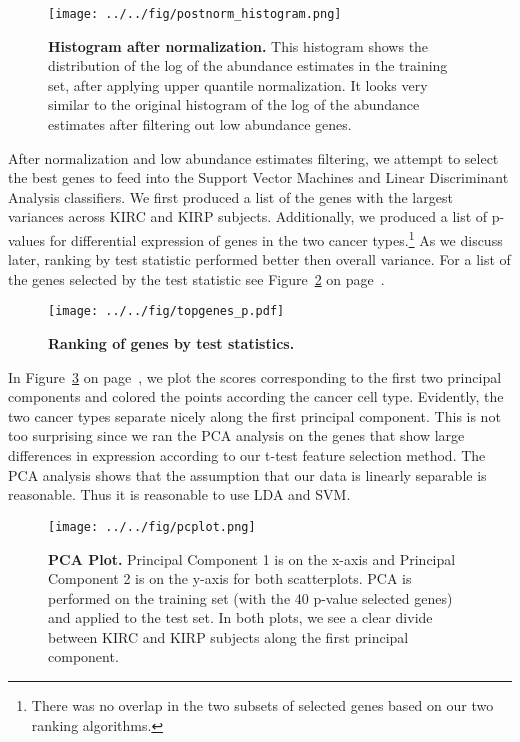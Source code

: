 \begin{figure}[H]
  \centering
    \texttt{[image: ../../fig/postnorm\_histogram.png]}
\caption{\textbf{Histogram after normalization.} This histogram shows the distribution
  of the log of the abundance estimates in the training set, after applying upper quantile
  normalization. It looks very similar to the original histogram of the
  log of the abundance estimates after filtering out low abundance genes.}
   \label{fig:histogrampost}
\end{figure}

After normalization and low abundance estimates filtering, we attempt to select the
best genes to feed into the Support Vector Machines and Linear Discriminant
Analysis classifiers.  We first produced a list of the genes with the largest
variances across KIRC and KIRP subjects.
Additionally, we produced a list of p-values for
differential expression of genes in the two cancer types.\footnote{There was
no overlap in the two subsets of selected genes based on our two ranking
algorithms.}
As we discuss later, ranking by test statistic performed better then
overall variance.  For a list of the genes selected by the test statistic
see Figure~\ref{fig:ttest} on page~\pageref{fig:ttest}.

\begin{figure}[H]
  \centering
    \texttt{[image: ../../fig/topgenes\_p.pdf]}
\caption{\textbf{Ranking of genes by test statistics.}}
   \label{fig:ttest}
\end{figure}



In Figure~\ref{fig:pca} on page~\pageref{fig:pca}, we plot the scores
corresponding to the first two principal components and colored the points
according the cancer cell type.  Evidently, the two cancer types separate
nicely along the first principal component. This is not too surprising since we
ran the PCA analysis on the genes that show large differences in expression
according to our t-test feature selection method.   The PCA analysis shows that
the assumption that our data is linearly separable is reasonable. Thus it is
reasonable to use LDA and SVM. 

\begin{figure}[H]
  \centering
    \texttt{[image: ../../fig/pcplot.png]}
\caption{\textbf{PCA Plot.} Principal Component 1 is on the x-axis and Principal
  Component 2 is on the y-axis for both scatterplots.  PCA is performed on the
  training set (with the 40 p-value selected genes) and applied to the test set.
  In both plots, we see a clear divide between 	KIRC and KIRP subjects along
  the first principal component.}
   \label{fig:pca}
\end{figure}

